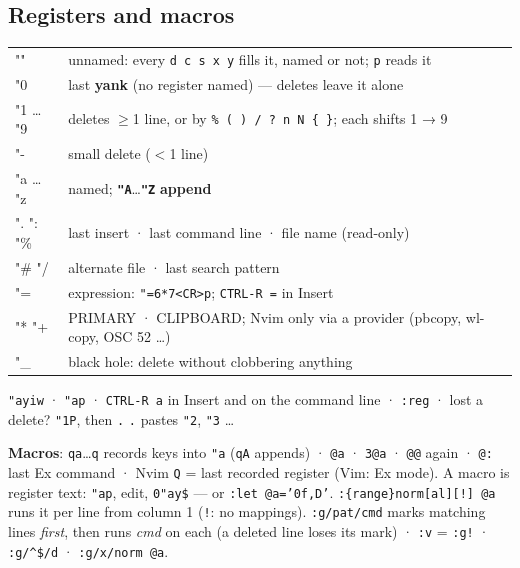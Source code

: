 \documentclass[8pt]{extarticle}
\newcommand\ct[1]{\texttt{#1}}
\newcommand\bq{\textasciigrave}
\newcommand\ca{\textasciicircum}
\begin{document}
\begin{multicols}{2}
\section{Registers and macros}
{\scriptsize\setlength{\tabcolsep}{2pt}
\begin{tabular}{@{}T{11mm}L{67mm}@{}}
\toprule
"{}" & unnamed: every \texttt{d c s x y} fills it, named or not; \texttt{p} reads it\\
"0 & last \textbf{yank} (no register named) — deletes leave it alone\\
"1 … "9 & deletes $\ge$1 line, or by \texttt{\% ( ) \bq{} / ? n N \{ \}}; each shifts 1 → 9\\
"- & small delete ($<$1 line)\\
"a … "z & named; \textbf{\texttt{"A}}…\textbf{\texttt{"Z}} \textbf{append}\\
". ": "\% & last insert · last command line · file name (read-only)\\
"\# "/ & alternate file · last search pattern\\
"= & expression: \texttt{"=6*7<CR>p}; \texttt{CTRL-R =} in Insert\\
"* "+ & PRIMARY · CLIPBOARD; Nvim only via a provider (pbcopy, wl-copy, OSC 52 …)\\
"\_ & black hole: delete without clobbering anything\\
\bottomrule
\end{tabular}}\par
\ct{"ayiw} · \ct{"ap} · \ct{CTRL-R a} in Insert and on the command line · \ct{:reg} · lost a
delete? \ct{"1P}, then \ct{.} \ct{.} pastes \ct{"2}, \ct{"3} …\par
\textbf{Macros}: \ct{qa}…\ct{q} records keys into \ct{"a} (\ct{qA} appends) · \ct{@a} · \ct{3@a}
· \ct{@@} again · \ct{@:} last Ex command · Nvim \ct{Q} = last recorded register (Vim: Ex mode).
A macro is register text: \ct{"ap}, edit, \ct{0"ay\$} — or \ct{:let @a='0f,D'}.
\ct{:\{range\}norm[al][!] @a} runs it per line from column 1 (\ct{!}: no mappings).
\ct{:g/pat/cmd} marks matching lines \emph{first}, then runs \emph{cmd} on each (a deleted line
loses its mark) · \ct{:v} = \ct{:g!} · \ct{:g/\ca\$/d} · \ct{:g/x/norm @a}.


\end{multicols}
\end{document}
